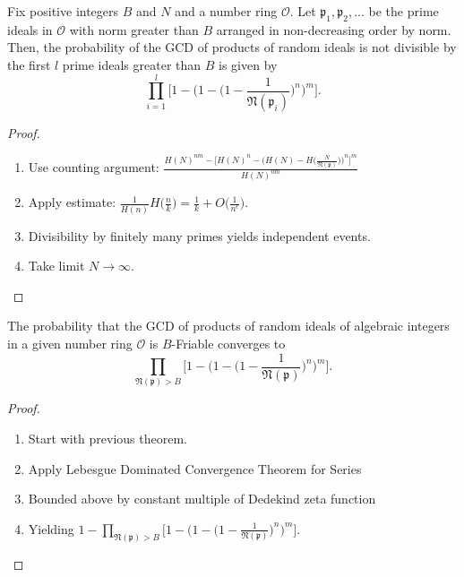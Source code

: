 \documentclass[11pt,xcolor={dvipsnames}]{beamer}
\newcommand{\f}[1]{\mathfrak{#1}}
\begin{document}
	\begin{frame}
	\begin{theorem}
		Fix positive integers $B$ and $N$ and a number ring $\mathcal{O}$. Let $\mathfrak{p}_1, \mathfrak{p}_2, ...$ be the prime ideals in $\mathcal{O}$ with norm greater than $B$ arranged in non-decreasing order by norm. Then, the probability of the GCD of products of random ideals is not divisible by the first $l$ prime ideals greater than $B$ is given by 
		$$\prod_{i=1}^{l} \Big[1 - \Big(1 - \Big(1-\frac{1}{\mathfrak{N}(\mathfrak{p}_i)}\Big)^n\Big)^m\Big].$$
	\end{theorem}
	
	\begin{proof}
		\begin{enumerate}
			\item Use counting argument: $\frac{H(N)^{nm}-\Big[H(N)^n - \Big(H(N) - H\Big(\frac{N}{\f{N(p)}}\Big)\Big)^n\Big]^m}{H(N)^{nm}}$
			\item Apply estimate: $\frac{1}{H(n)} H\Big(\frac{n}{k}\Big) = \frac{1}{k} + O\Big(\frac{1}{n^{\epsilon}}\Big).$
			\item Divisibility by finitely many primes yields independent events.
			\item Take limit $N \to \infty$.
		\end{enumerate}
	\end{proof}
\end{frame}

\begin{frame}
	\begin{theorem}
		The probability that the GCD of products of random ideals of algebraic integers in a given number ring $\mathcal{O}$ is $B$-Friable converges to
		$$\prod_{\f{N}(\f{p})>B}\Big[1 - \Big(1 - \Big(1 - \frac{1}{\f{N}(\f{p})}\Big)^n \Big)^m \Big].$$
	\end{theorem}
	\begin{proof}
		\begin{enumerate}
			\item Start with previous theorem.
			\item Apply Lebesgue Dominated Convergence Theorem for Series
			\item Bounded above by constant multiple of Dedekind zeta function
			\item Yielding $1 - \prod_{\mathfrak{N}(\mathfrak{p}) > B} \Big[1 - \Big(1 - \Big(1 - \frac{1}{\mathfrak{N}(\mathfrak{p})}  \Big)^n\Big)^m\Big].$
		\end{enumerate}
	\end{proof}
\end{frame}
\end{document}

